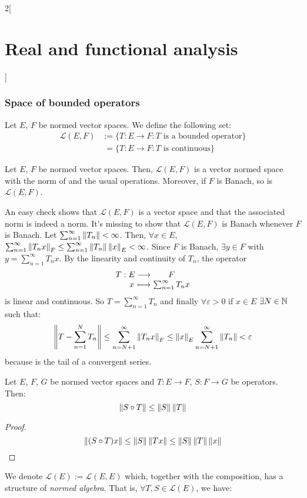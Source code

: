 \documentclass[../../../main_math.tex]{subfiles}
\begin{document}
\begin{multicols}{2}[\section{Real and functional analysis}]
  \subsubsection{Space of bounded operators}
  \begin{definition}
    Let $E$, $F$ be normed vector spaces. We define the following set:
    \begin{align*}
      \mathcal{L}(E,F) & := \{T:E\rightarrow F: T\text{ is a bounded operator}\}            \\
                       & \;=                   \{T:E\rightarrow F: T\text{ is continuous}\}
    \end{align*}
  \end{definition}
  \begin{theorem}
    Let $E$, $F$ be normed vector spaces. Then, $\mathcal{L}(E,F)$ is a vector normed space with the norm of  and the usual operations. Moreover, if $F$ is Banach, so is $\mathcal{L}(E,F)$.
  \end{theorem}
  \begin{sproof}
    An easy check shows that $\mathcal{L}(E,F)$ is a vector space and that the associated norm is indeed a norm. It's missing to show that $\mathcal{L}(E,F)$ is Banach whenever $F$ is Banach. Let $\sum_{n=1}^\infty\left\|T_n\right\|<\infty$. Then, $\forall x\in E$, $\sum_{n=1}^\infty\left\|T_nx\right\|_F\leq \sum_{n=1}^\infty\left\|T_n\right\|\left\|x\right\|_E<\infty$. Since $F$ is Banach, $\exists y\in F$ with $y=\sum_{n=1}^\infty T_nx$. By the linearity and continuity of $T_n$, the operator
    $$\function{T}{E}{F}{x}{\sum_{n=1}^\infty T_nx}$$
    is linear and continuous. So $T=\sum_{n=1}^\infty T_n$ and finally $\forall \varepsilon>0$ if $x\in E$ $\exists N\in\mathbb{N}$ such that:
    $$\left\|T-\sum_{n=1}^N T_n\right\|\leq \sum_{n=N+1}^\infty \left\|T_n x\right\|_F\leq \left\|x\right\|_E\sum_{n=N+1}^\infty \left\|T_n\right\|<\varepsilon$$
    because is the tail of a convergent series.
  \end{sproof}
  \begin{proposition}
    Let $E$, $F$, $G$ be normed vector spaces and $T:E\rightarrow F$, $S:F\rightarrow G$ be operators. Then: $$\left\|S\circ T\right\|\leq\left\|S\right\|\left\|T\right\|$$
  \end{proposition}
  \begin{proof}
    $$\left\|(S\circ T)x\right\|\leq \left\|S\right\|\left\|Tx\right\|\leq \left\|S\right\|\left\|T\right\|\left\|x\right\|$$
  \end{proof}
  \begin{definition}
    We denote $\mathcal{L}(E):=\mathcal{L}(E,E)$ which, together with the composition, has a structure of \emph{normed algebra}. That is, $\forall T,S\in\mathcal{L}(E)$, we have:

\end{definition}
\end{multicols}
\end{document}
